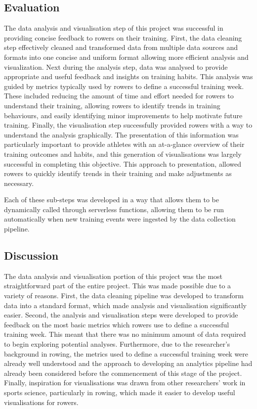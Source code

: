 \subsection{Evaluation}
The data analysis and visualisation step of this project was successful in providing concise feedback to rowers on their training. First, the data cleaning step effectively cleaned and transformed data from multiple data sources and formats into one concise and uniform format allowing more efficient analysis and visualization. Next during the analysis step, data was analysed to provide appropriate and useful feedback and insights on training habits. This analysis was guided by metrics typically used by rowers to define a successful training week. These included reducing the amount of time and effort needed for rowers to understand their training, allowing rowers to identify trends in training behaviours, and easily identifying minor improvements to help motivate future training. Finally, the visualisation step successfully provided rowers with a way to understand the analysis graphically. The presentation of this information was particularly important to provide athletes with an at-a-glance overview of their training outcomes and habits, and this generation of visualisations was largely successful in completing this objective. This approach to presentation, allowed rowers to quickly identify trends in their training and make adjustments as necessary.

Each of these sub-steps was developed in a way that allows them to be dynamically called through serverless functions, allowing them to be run automatically when new training events were ingested by the data collection pipeline.

\subsection{Discussion}
The data analysis and visualisation portion of this project was the most straightforward part of the entire project. This was made possible due to a variety of reasons. First, the data cleaning pipeline was developed to transform data into a standard format, which made analysis and visualisation significantly easier. Second, the analysis and visualisation steps were developed to provide feedback on the most basic metrics which rowers use to define a successful training week. This meant that there was no minimum amount of data required to begin exploring potential analyses. Furthermore, due to the researcher's background in rowing, the metrics used to define a successful training week were already well understood and the approach to developing an analytics pipeline had already been considered before the commencement of this stage of the project. Finally, inspiration for visualisations was drawn from other researchers' work in sports science, particularly in rowing, which made it easier to develop useful visualisations for rowers.


